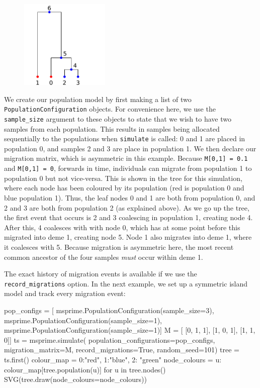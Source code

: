 \documentclass[graybox]{svmult}
\newcommand{\includenbimage}[1]{\begin{center}\texttt{[image: \#1]}\end{center}}
\begin{document}
\begin{figure}
  \begin{center}
    \includegraphics[width=0.38\textwidth]{images/simulations_26_0.pdf}
  \end{center}
\end{figure}
%

    We create our population model by first making a list of two
\texttt{PopulationConfiguration} objects. For convenience here, we use
the \texttt{sample\_size} argument to these objects to state that we
wish to have two samples from each population. This results in samples
being allocated sequentially to the populations when \texttt{simulate}
is called: 0 and 1 are placed in population 0, and samples 2 and 3 are
place in population 1. We then declare our migration matrix, which is
asymmetric in this example. Because \texttt{M{[}0,1{]}\ =\ 0.1} and
\texttt{M{[}0,1{]}\ =\ 0}, forwards in time, individuals can migrate
from population 1 to population 0 but not vice-versa. This is shown in
the tree for this simulation, where each node has been coloured by its
population (red is population 0 and blue population 1). Thus, the leaf
nodes 0 and 1 are both from population 0, and 2 and 3 are both from
population 2 (as explained above). As we go up the tree, the first event
that occurs is 2 and 3 coalescing in population 1, creating node 4.
After this, 4 coalesces with with node 0, which has at some point before
this migrated into deme 1, creating node 5. Node 1 also migrates into
deme 1, where it coalesces with 5. Because migration is asymmetric here,
the most recent common ancestor of the four samples \emph{must} occur
within deme 1.

The exact history of migration events is available if we use the
\texttt{record\_migrations} option. In the next example, we set up a
symmetric island model and track every migration event:

\begin{pythoncode}
pop_configs = [
    msprime.PopulationConfiguration(sample_size=3),
    msprime.PopulationConfiguration(sample_size=1),
    msprime.PopulationConfiguration(sample_size=1)]
M = [
    [0, 1, 1],
    [1, 0, 1],
    [1, 1, 0]]
ts  = msprime.simulate(
    population_configurations=pop_configs, migration_matrix=M,
    record_migrations=True, random_seed=101)
tree = ts.first()
colour_map = {0:"red", 1:"blue", 2: "green"}
node_colours = {
    u: colour_map[tree.population(u)] for u in tree.nodes()}
SVG(tree.draw(node_colours=node_colours))
\end{pythoncode}
\end{document}

